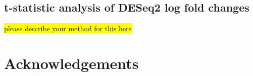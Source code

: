 \documentclass[fleqn,10pt,table]{wlscirep}
\newcommand{\todo}[1]{\colorbox{yellow}{#1}}
\begin{document}

%

\subsection{t-statistic analysis of DESeq2 log fold changes}

\todo{please describe your method for this here}

\section{Acknowledgements}
\end{document}
